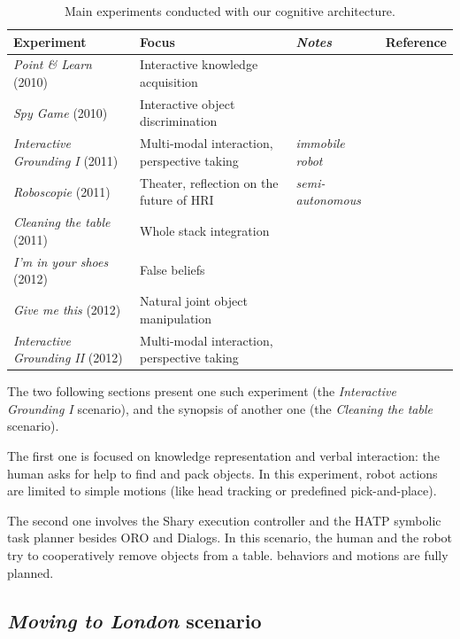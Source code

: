 \documentclass[preprint,3p,times]{elsarticle}
\begin{document}
\begin{table}
\begin{center}

\begin{tabular}{llll}
 \bf{Experiment} & Focus & \emph{Notes} & Reference \\
\hline
{\it Point \& Learn} (2010) & Interactive knowledge acquisition & & \cite{Lemaignan2010} \\
{\it Spy Game} (2010) & Interactive object discrimination & & \cite{Ros2010b} \\
{\it Interactive Grounding I} (2011) & Multi-modal interaction, perspective taking & \emph{immobile robot} & \cite{lemaignan2011what} \\
{\it Roboscopie} (2011) & Theater, reflection on the future of HRI & \emph{semi-autonomous} & \cite{lemaignan2012roboscopie} \\
{\it Cleaning the table} (2011) & Whole stack integration & & \cite{Alami2011} \\
{\it I'm in your shoes} (2012) & False beliefs & & \cite{warnier2012when} \\
{\it Give me this} (2012) & Natural joint object manipulation & & \cite{gharbi2013natural} \\
{\it Interactive Grounding II} (2012) & Multi-modal interaction, perspective taking & & \cite{lemaignan2013talking} \\
\hline

\end{tabular}
\end{center}
\caption{Main experiments conducted with our cognitive architecture.}
\label{table|experiences}
\end{table}

The two following sections present one such experiment (the {\it Interactive
Grounding I} scenario), and the synopsis of another one (the {\it Cleaning the
table} scenario).

The first one is focused on knowledge representation and verbal interaction:
the human asks for help to find and pack objects. In this experiment, robot
actions are limited to simple motions (like head tracking or predefined
pick-and-place).

The second one involves the {\sc Shary} execution controller and the HATP symbolic
task planner besides ORO and {\sc Dialogs}. In this scenario, the human and the
robot try to cooperatively remove objects from a table. behaviors and motions
are fully planned.

\subsection{\emph{Moving to London} scenario}
\end{document}
